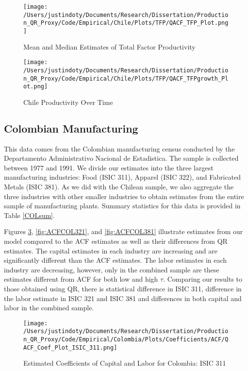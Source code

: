 \documentclass[11pt]{article}
\begin{document}
\begin{figure}[H]
\centering
\caption{Mean and Median Estimates of Total Factor Productivity}
\texttt{[image: /Users/justindoty/Documents/Research/Dissertation/Production\_QR\_Proxy/Code/Empirical/Chile/Plots/TFP/QACF\_TFP\_Plot.png]}
\label{fig:ACFCHLTFPDens}
\end{figure}

\begin{figure}[H]
\centering
\caption{Chile Productivity Over Time}
\texttt{[image: /Users/justindoty/Documents/Research/Dissertation/Production\_QR\_Proxy/Code/Empirical/Chile/Plots/TFP/QACF\_TFPgrowth\_Plot.png]}
\label{fig:ACFCHLpgrowth}
\end{figure}




\subsection{Colombian Manufacturing}
This data comes from the Colombian manufacturing census conducted by the Departamento Administrativo Nacional de Estadistica. The sample is collected between 1977 and 1991. We divide our estimates into the three largest manufacturing industries: Food (ISIC 311), Apparel (ISIC 322), and Fabricated Metals (ISIC 381). As we did with the Chilean sample, we also aggregate the three industries with other smaller industries to obtain estimates from the entire sample of manufacturing plants. Summary statistics for this data is provided in Table \ref{COLsum}.

Figures \ref{fig:ACFCOL311}, \ref{fig:ACFCOL321}, and \ref{fig:ACFCOL381} illustrate estimates from our model compared to the ACF estimates as well as their differences from QR estimates. The capital estimates in each industry are increasing and are significantly different than the ACF estimates. The labor estimates in each industry are decreasing, however, only in the combined sample are these estimates different from ACF for both low and high $\tau$. Comparing our results to those obtained using QR, there is statistical difference in ISIC 311, difference in the labor estimate in ISIC 321 and ISIC 381 and differences in both capital and labor in the combined sample.

\begin{figure}[H]
\centering
\caption{Estimated Coefficients of Capital and Labor for Colombia: ISIC 311}
\texttt{[image: /Users/justindoty/Documents/Research/Dissertation/Production\_QR\_Proxy/Code/Empirical/Colombia/Plots/Coefficients/ACF/QACF\_Coef\_Plot\_ISIC\_311.png]}
\label{fig:ACFCOL311}
\end{figure}
\end{document}

